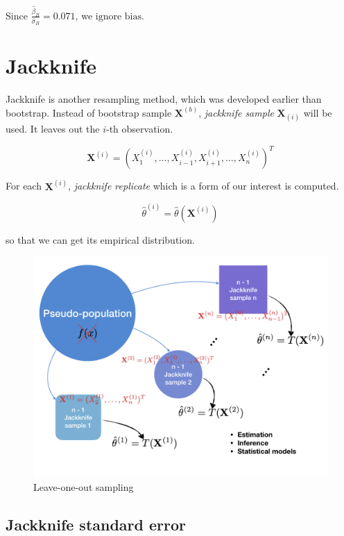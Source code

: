 \documentclass[]{book}
\theoremstyle{definition}
\theoremstyle{definition}
\theoremstyle{definition}
\theoremstyle{remark}
\begin{document}
Since \(\frac{\hat\beta_B}{\hat\sigma_B} = 0.071\), we \(\text{ignore bias}\).

\hypertarget{jackknife}{%
\section{Jackknife}\label{jackknife}}

Jackknife is another resampling method, which was developed earlier than bootstrap. Instead of bootstrap sample \(\mathbf{X}^{(b)}\), \emph{jackknife sample} \(\mathbf{X}_{(i)}\) will be used. It leaves out the \(i\)-th observation.

\begin{equation}
  \mathbf{X}^{(i)} = (X_1^{(i)}, \ldots, X_{i - 1}^{(i)}, X_{i + 1}^{(i)}, \ldots, X_n^{(i)})^T
  \label{eq:jacksam}
\end{equation}

For each \(\mathbf{X}^{(i)}\), \emph{jackknife replicate} which is a form of our interest is computed.

\begin{equation}
  \hat\theta^{(i)} = \hat\theta(\mathbf{X}^{(i)})
  \label{eq:jackrep}
\end{equation}

so that we can get its empirical distribution.

\begin{figure}[H]

{\centering \includegraphics[width=0.7\linewidth]{images/jack} 

}

\caption{Leave-one-out sampling}\label{fig:jackfig}
\end{figure}

\hypertarget{jackknife-standard-error}{%
\subsection{Jackknife standard error}\label{jackknife-standard-error}}
\end{document}
